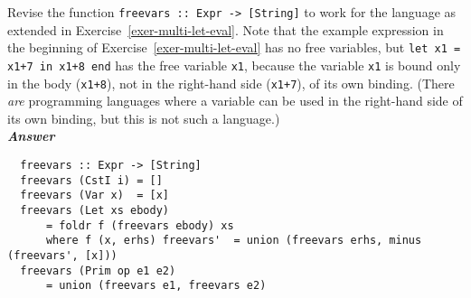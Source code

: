 \documentclass[a4paper]{article}
\begin{document}
\begin{exercise}\label{exer-multi-let-closed}
  Revise the function \texttt{freevars ::\ Expr -> [String]} to work
  for the language as extended in Exercise~\ref{exer-multi-let-eval}.
  Note that the example expression in the beginning of
  Exercise~\ref{exer-multi-let-eval} has no free variables, but
  \texttt{let x1 = x1+7 in x1+8 end} has the free variable
  \texttt{x1}, because the variable \texttt{x1} is bound only in the
  body (\texttt{x1+8}), not in the right-hand side (\texttt{x1+7}), of
  its own binding.  (There \emph{are} programming languages where a
  variable can be used in the right-hand side of its own binding, but
  this is not such a language.)\\
  
\noindent
\textbf{\emph{Answer}}
{\codesetup\begin{verbatim}
  freevars :: Expr -> [String]
  freevars (CstI i) = []
  freevars (Var x)  = [x]
  freevars (Let xs ebody) 
      = foldr f (freevars ebody) xs 
      where f (x, erhs) freevars'  = union (freevars erhs, minus (freevars', [x]))
  freevars (Prim op e1 e2) 
      = union (freevars e1, freevars e2)
\end{verbatim}}
\end{exercise}
\end{document}
